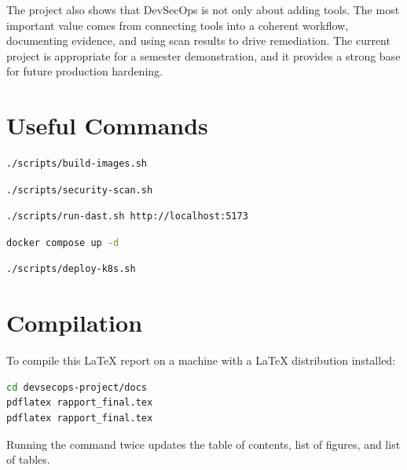 \documentclass[12pt,a4paper]{report}
\begin{document}
The project also shows that DevSecOps is not only about adding tools. The most important value comes from connecting tools into a coherent workflow, documenting evidence, and using scan results to drive remediation. The current project is appropriate for a semester demonstration, and it provides a strong base for future production hardening.

\appendix

\chapter{Useful Commands}

\begin{lstlisting}[language=bash,caption={Build Docker images}]
./scripts/build-images.sh
\end{lstlisting}

\begin{lstlisting}[language=bash,caption={Run container vulnerability scans}]
./scripts/security-scan.sh
\end{lstlisting}

\begin{lstlisting}[language=bash,caption={Run DAST scan}]
./scripts/run-dast.sh http://localhost:5173
\end{lstlisting}

\begin{lstlisting}[language=bash,caption={Deploy locally}]
docker compose up -d
\end{lstlisting}

\begin{lstlisting}[language=bash,caption={Deploy to Kubernetes}]
./scripts/deploy-k8s.sh
\end{lstlisting}

\chapter{Compilation}

To compile this LaTeX report on a machine with a LaTeX distribution installed:

\begin{lstlisting}[language=bash,caption={Compile the LaTeX report}]
cd devsecops-project/docs
pdflatex rapport_final.tex
pdflatex rapport_final.tex
\end{lstlisting}

Running the command twice updates the table of contents, list of figures, and list of tables.
\end{document}
